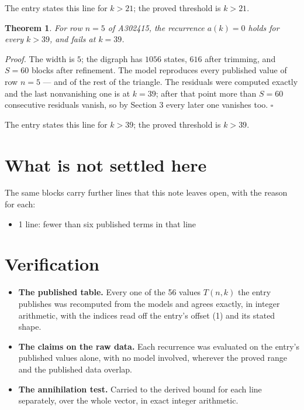 \documentclass[11pt]{article}
\newtheorem{theorem}{Theorem}
\theoremstyle{definition}
\begin{document}
The entry states this line for $k > 21$; the proved threshold is $k > 21$.

\begin{theorem} For row $n = 5$ of A302415, the recurrence $a(k) = 0$ holds for every $k > 39$, and fails at $k = 39$.\end{theorem}

{\itshape Proof.} The width is $5$; the digraph has $1056$ states, $616$ after trimming, and $S = 60$ blocks after refinement. The model reproduces every published value of row $n = 5$ --- and of the rest of the triangle. The residuals were computed exactly and the last nonvanishing one is at $k = 39$; after that point more than $S = 60$ consecutive residuals vanish, so by Section 3 every later one vanishes too. $\square$

The entry states this line for $k > 39$; the proved threshold is $k > 39$.

\section{What is not settled here}

The same blocks carry further lines that this note leaves open, with the reason for each:

\begin{itemize}

\item 1 line: fewer than six published terms in that line

\end{itemize}

\section{Verification}

\begin{itemize}

\item {\bfseries The published table.} Every one of the 56 values $T(n,k)$ the entry publishes was recomputed from the models and agrees exactly, in integer arithmetic, with the indices read off the entry's offset (1) and its stated shape.

\item {\bfseries The claims on the raw data.} Each recurrence was evaluated on the entry's published values alone, with no model involved, wherever the proved range and the published data overlap.

\item {\bfseries The annihilation test.} Carried to the derived bound for each line separately, over the whole vector, in exact integer arithmetic.

\end{itemize}
\end{document}

